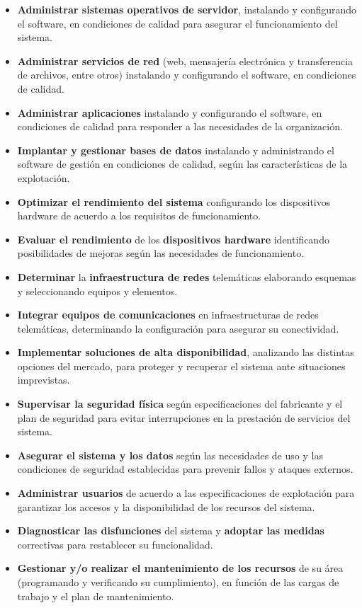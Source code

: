\begin{itemize}
    \begin{itemize}
        \item \textbf{Administrar sistemas operativos de servidor}, instalando y configurando el software, en condiciones de calidad para asegurar el funcionamiento del sistema.
        \item \textbf{Administrar servicios de red} (web, mensajería electrónica y transferencia de archivos, entre otros) instalando y configurando el software, en condiciones de calidad.
        \item \textbf{Administrar aplicaciones} instalando y configurando el software, en condiciones de calidad para responder a las necesidades de la organización.
        \item\textbf{ Implantar y gestionar bases de datos} instalando y administrando el software de gestión en condiciones de calidad, según las características de la explotación.
        \item \textbf{Optimizar el rendimiento del sistema} configurando los dispositivos hardware de acuerdo a los requisitos de funcionamiento.
        \item \textbf{Evaluar el rendimiento} de los \textbf{dispositivos hardware} identificando posibilidades de mejoras según las necesidades de funcionamiento.
        \item \textbf{Determinar} la \textbf{infraestructura de redes} telemáticas elaborando esquemas y seleccionando equipos y elementos.
        \item \textbf{Integrar equipos de comunicaciones} en infraestructuras de redes telemáticas, determinando la configuración para asegurar su conectividad.
        \item \textbf{Implementar soluciones de alta disponibilidad}, analizando las distintas opciones del mercado, para proteger y recuperar el sistema ante situaciones imprevistas.
        \item \textbf{Supervisar la seguridad física} según especificaciones del fabricante y el plan de seguridad para evitar interrupciones en la prestación de servicios del sistema.
        \item \textbf{Asegurar el sistema y los datos} según las necesidades de uso y las condiciones de seguridad establecidas para prevenir fallos y ataques externos.
        \item \textbf{Administrar usuarios} de acuerdo a las especificaciones de explotación para garantizar los accesos y la disponibilidad de los recursos del sistema.
        \item \textbf{Diagnosticar las disfunciones} del sistema y \textbf{adoptar las medidas} correctivas para restablecer su funcionalidad.
        \item \textbf{Gestionar y/o realizar el mantenimiento de los recursos} de su área (programando y verificando su cumplimiento), en función de las cargas de trabajo y el plan de mantenimiento.
    \end{itemize}
\end{itemize}

